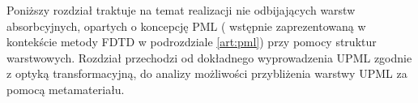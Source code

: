 Poniższy rozdział traktuje na temat realizacji nie odbijających warstw absorbcyjnych, opartych o koncepcję PML ( wstępnie zaprezentowaną w kontekście metody FDTD w podrozdziale \ref{art:pml}) przy pomocy struktur warstwowych. Rozdział przechodzi od dokładnego wyprowadzenia UPML zgodnie z optyką transformacyjną, do analizy możliwości przybliżenia warstwy UPML za pomocą metamateriału.


